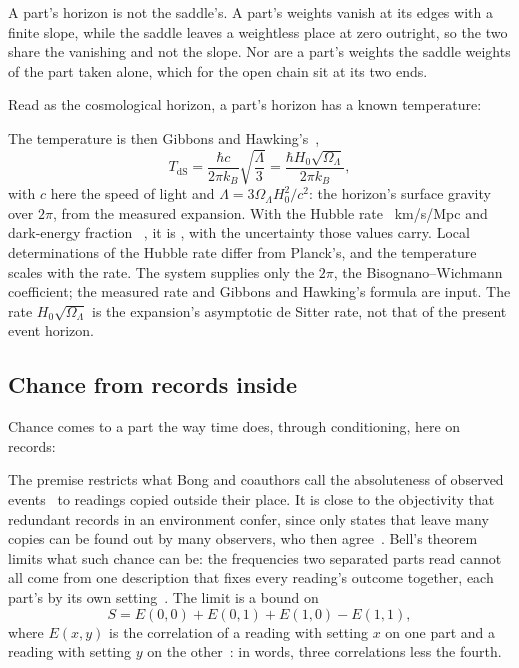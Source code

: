 \documentclass[aps,prd,reprint,superscriptaddress]{revtex4-2}
\begin{document}
A part's horizon is not the saddle's. A part's weights vanish at its edges with a finite slope, while the saddle leaves a weightless place at zero outright, so the two share the vanishing and not the slope. Nor are a part's weights the saddle weights of the part taken alone, which for the open chain sit at its two ends.

Read as the cosmological horizon, a part's horizon has a known temperature:


The temperature is then Gibbons and Hawking's~\cite{GibbonsHawking1977},
\begin{equation}
  T_{\mathrm{dS}} = \frac{\hbar c}{2\pi k_B}\sqrt{\frac{\Lambda}{3}} = \frac{\hbar H_0 \sqrt{\Omega_\Lambda}}{2\pi k_B},
  \label{eq:desitter}
\end{equation}
with $c$ here the speed of light and $\Lambda = 3\Omega_\Lambda H_0^2/c^2$: the horizon's surface gravity over $2\pi$, from the measured expansion. With the Hubble rate ~km/s/Mpc and dark-energy fraction ~\cite{Planck2018}, it is , with the  uncertainty those values carry. Local determinations of the Hubble rate differ from Planck's, and the temperature scales with the rate. The system supplies only the $2\pi$, the Bisognano--Wichmann coefficient; the measured rate and Gibbons and Hawking's formula are input. The rate $H_0\sqrt{\Omega_\Lambda}$ is the expansion's asymptotic de Sitter rate, not that of the present event horizon.

\subsection{Chance from records inside}
\label{sec:readings-records}

Chance comes to a part the way time does, through conditioning, here on records:


The premise restricts what Bong and coauthors call the absoluteness of observed events~\cite{BongEtAl2020} to readings copied outside their place. It is close to the objectivity that redundant records in an environment confer, since only states that leave many copies can be found out by many observers, who then agree~\cite{OllivierPoulinZurek2004,Zurek2009}. Bell's theorem limits what such chance can be: the frequencies two separated parts read cannot all come from one description that fixes every reading's outcome together, each part's by its own setting~\cite{Bell1964}. The limit is a bound on
\begin{equation}
  S = E(0,0) + E(0,1) + E(1,0) - E(1,1),
  \label{eq:chsh}
\end{equation}
where $E(x,y)$ is the correlation of a reading with setting $x$ on one part and a reading with setting $y$ on the other~\cite{ClauserEtAl1969,Tsirelson1980}: in words, three correlations less the fourth.
\end{document}
